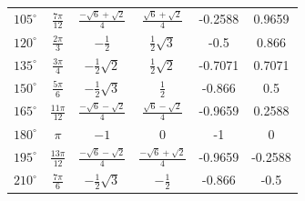 \begin{minipage}{\linewidth}
\begin{tabular}{rcccS[table-format=1.4]S[table-format=1.4]}
\midrule
\textcolor{\colgray}{$\displaystyle 105^\circ$} & \textcolor{\colgray}{$\displaystyle \frac{7\pi}{12}$} & \textcolor{\colgray}{$\displaystyle \frac{-\sqrt{6}+\sqrt{2}}{4}$} & \textcolor{\colgray}{$\displaystyle \frac{\sqrt{6}+\sqrt{2}}{4}$} & \textcolor{\colgray}{-0.2588} & \textcolor{\colgray}{0.9659} \\
\textcolor{\colblue}{$\displaystyle 120^\circ$} & \textcolor{\colblue}{$\displaystyle \frac{2\pi}{3}$} & \textcolor{\colblue}{$\displaystyle -\frac{1}{2}$} & \textcolor{\colblue}{$\displaystyle \frac{1}{2}\sqrt{3}$} & \textcolor{\colblue}{-0.5} & \textcolor{\colblue}{0.866} \\
\textcolor{\colred}{$\displaystyle 135^\circ$} & \textcolor{\colred}{$\displaystyle \frac{3\pi}{4}$} & \textcolor{\colred}{$\displaystyle -\frac{1}{2}\sqrt{2}$} & \textcolor{\colred}{$\displaystyle \frac{1}{2}\sqrt{2}$} & \textcolor{\colred}{-0.7071} & \textcolor{\colred}{0.7071} \\
\textcolor{\colblue}{$\displaystyle 150^\circ$} & \textcolor{\colblue}{$\displaystyle \frac{5\pi}{6}$} & \textcolor{\colblue}{$\displaystyle -\frac{1}{2}\sqrt{3}$} & \textcolor{\colblue}{$\displaystyle \frac{1}{2}$} & \textcolor{\colblue}{-0.866} & \textcolor{\colblue}{0.5} \\
\textcolor{\colgray}{$\displaystyle 165^\circ$} & \textcolor{\colgray}{$\displaystyle \frac{11\pi}{12}$} & \textcolor{\colgray}{$\displaystyle \frac{-\sqrt{6}-\sqrt{2}}{4}$} & \textcolor{\colgray}{$\displaystyle \frac{\sqrt{6}-\sqrt{2}}{4}$} & \textcolor{\colgray}{-0.9659} & \textcolor{\colgray}{0.2588} \\
\midrule
\textcolor{\colblack}{$\displaystyle 180^\circ$} & \textcolor{\colblack}{$\displaystyle \pi$} & \textcolor{\colblack}{$\displaystyle -1$} & \textcolor{\colblack}{$\displaystyle 0$} &  &  \\
\midrule
\textcolor{\colgray}{$\displaystyle 195^\circ$} & \textcolor{\colgray}{$\displaystyle \frac{13\pi}{12}$} & \textcolor{\colgray}{$\displaystyle \frac{-\sqrt{6}-\sqrt{2}}{4}$} & \textcolor{\colgray}{$\displaystyle \frac{-\sqrt{6}+\sqrt{2}}{4}$} & \textcolor{\colgray}{-0.9659} & \textcolor{\colgray}{-0.2588} \\
\textcolor{\colblue}{$\displaystyle 210^\circ$} & \textcolor{\colblue}{$\displaystyle \frac{7\pi}{6}$} & \textcolor{\colblue}{$\displaystyle -\frac{1}{2}\sqrt{3}$} & \textcolor{\colblue}{$\displaystyle -\frac{1}{2}$} & \textcolor{\colblue}{-0.866} & \textcolor{\colblue}{-0.5} \\

\end{tabular}
\end{minipage}
